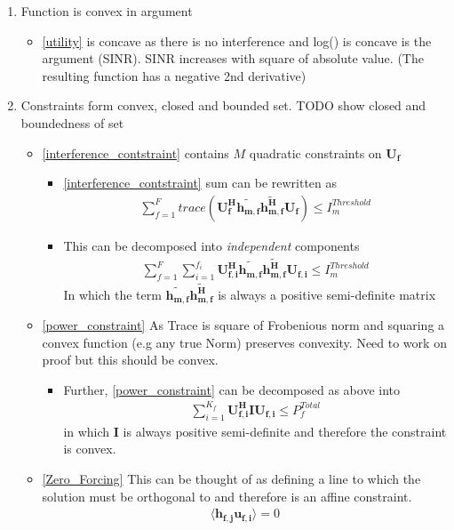 \documentclass[12pt]{article}
\begin{document}
\begin{enumerate}
\item Function is convex in argument 
\begin{itemize}
\item\eqref{utility} is concave as there is no interference and log() is concave is the argument (SINR). SINR increases with square of absolute value. (The resulting function has a negative 2nd derivative)

\end{itemize}

\item Constraints form convex, closed and bounded set. TODO show closed and boundedness of set

\begin{itemize}

\item\eqref{interference_contstraint} contains $M$ quadratic constraints on $\mathbf{U_f}$
\begin{itemize}
\item \eqref{interference_contstraint} sum can be rewritten as 
\begin{gather}
\sum_{f=1}^F
trace(\mathbf{U_f^H} \mathbf{\tilde{h_{m,f}}} \mathbf{\tilde{h_{m,f}^H}} \mathbf{U_f} )\leq I^{Threshold}_{m}
\end{gather}
\item This can be decomposed into \textit{independent} components 
\begin{gather}
\sum_{f=1}^F
\sum_{i=1}^{f_i}
\mathbf{U_{f,i}^H} \mathbf{\tilde{h_{m,f}}} \mathbf{\tilde{h_{m,f}^H}} \mathbf{U_{f,i}} \leq I^{Threshold}_{m}
\end{gather}
In which the term $ \mathbf{\tilde{h_{m,f}}} \mathbf{\tilde{h_{m,f}^H}}$ is always a positive semi-definite matrix
\end{itemize}

\item\eqref{power_constraint} As Trace is square of Frobenious norm and squaring a convex function (e.g any true Norm) preserves convexity.
Need to work on proof but this should be convex.
\begin{itemize}
\item Further, \eqref{power_constraint} can be decomposed as above into
\begin{gather}
\sum_{i=1}^{K_f}\mathbf{U_{f,i}^H} \mathbf{I} \mathbf{U_{f,i}} \leq  P^{Total}_{f}
\end{gather}
in which $\mathbf{I}$ is always positive semi-definite and therefore the constraint is convex.
\end{itemize}

\item\eqref{Zero_Forcing} 
This can be thought of as defining a line to which the solution must be orthogonal to and therefore is an affine constraint. 
\begin{gather}
\langle \mathbf{h_{f,j}}\mathbf{u_{f,i}} \rangle =0
\end{gather}

\end{itemize}
\end{enumerate}
\end{document}
